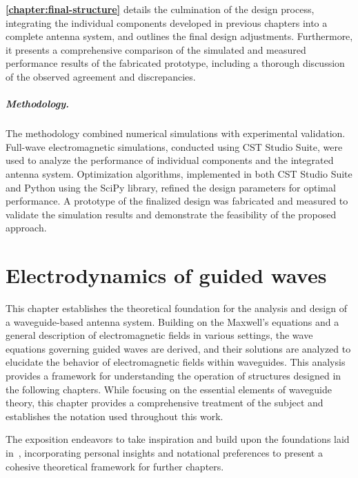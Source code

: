 \documentclass[14pt,a4paper]{ntust_report}
\begin{document}
\textbf{\cref{chapter:final-structure}} details the culmination of the design process, integrating the individual components developed in previous chapters into a complete antenna system, and outlines the final design adjustments. Furthermore, it presents a comprehensive comparison of the simulated and measured performance results of the fabricated prototype, including a thorough discussion of the observed agreement and discrepancies.

\paragraph*{Methodology.} The methodology combined numerical simulations with experimental validation. Full-wave electromagnetic simulations, conducted using CST Studio Suite, were used to analyze the performance of individual components and the integrated antenna system. Optimization algorithms, implemented in both CST Studio Suite and Python using the SciPy library, refined the design parameters for optimal performance. A prototype of the finalized design was fabricated and measured to validate the simulation results and demonstrate the feasibility of the proposed approach.


\chapter{Electrodynamics of guided waves}
\label{chapter:electrodynamics}
This chapter establishes the theoretical foundation for the analysis and design of a waveguide-based antenna system. Building on the Maxwell's equations and a general description of electromagnetic fields in various settings, the wave equations governing guided waves are derived, and their solutions are analyzed to elucidate the behavior of electromagnetic fields within waveguides. This analysis provides a framework for understanding the operation of structures designed in the following chapters. While focusing on the essential elements of waveguide theory, this chapter provides a comprehensive treatment of the subject and establishes the notation used throughout this work.

The exposition endeavors to take inspiration and build upon the foundations laid in~\parencite{balanis:advanced-engineering-electromagnetics,griffiths:introduction-to-electrodynamics,zangwill:modern-electrodynamics}, incorporating personal insights and notational preferences to present a cohesive theoretical framework for further chapters.
\end{document}
